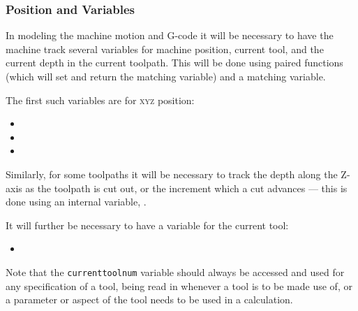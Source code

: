\documentclass{ltxdoc}
\begin{document}
\subsubsection{Position and Variables}
 
In modeling the machine motion and G-code it will be necessary to have the machine track several variables for machine position, current tool, and the current depth in the current toolpath. This will be done using paired functions (which will set and return the  matching variable) and a matching variable.

\begin{samepage}
The first such variables are for \textsc{xyz} position:

\begin{itemize}
 \item {}
 \item {}
 \item {}
\end{itemize}
\end{samepage}

\noindent Similarly, for some toolpaths it will be necessary to track the depth along the Z-axis as the toolpath is cut out, or the increment which a cut advances --- this is done using an internal variable, .
% 

\begin{samepage}

It will further be necessary to have a variable for the current tool:

\begin{itemize}
 \item {}
\end{itemize}
\end{samepage}

\noindent Note that the \verb|currenttoolnum| variable should always be accessed and used for any specification of a tool, being read in whenever a tool is to be made use of, or a parameter or aspect of the tool needs to be used in a calculation. %
\end{document}
